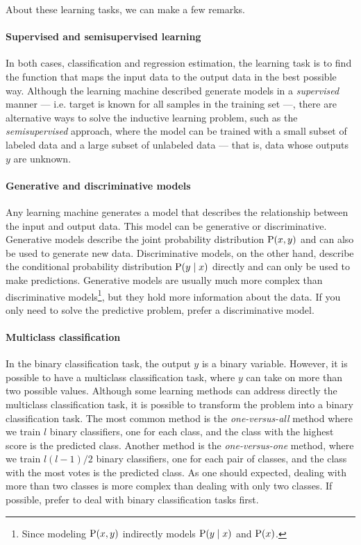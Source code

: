 About these learning tasks, we can make a few remarks.

\paragraph{Supervised and semisupervised learning}
In both cases, classification and regression estimation, the learning task is to find the function
that maps the input data to the output data in the best possible way.  Although the
learning machine described generate models in a \emph{supervised} manner --- i.e. target
is known for all samples in the training set ---, there are
alternative ways to solve the inductive learning problem, such as the \emph{semisupervised}
approach, where the model can be trained with a small subset of labeled data and a large
subset of unlabeled data --- that is, data whose outputs $y$ are unknown.

\paragraph{Generative and discriminative models}
Any learning machine generates a model that describes the relationship between the input
and output data.  This model can be generative or discriminative.  Generative models
describe the joint probability distribution $\operatorname{P}(x, y)$ and can also be used to generate new
data.  Discriminative models, on the other hand, describe the conditional probability
distribution $\operatorname{P}(y \mid x)$ directly and can only be used to make predictions. Generative models are
usually much more complex than discriminative models\footnote{Since modeling $\operatorname{P}(x, y)$
indirectly models $\operatorname{P}(y \mid x)$ and $\operatorname{P}(x)$.}, but they hold more information about
the data.  If you only
need to solve the predictive problem, prefer a discriminative model.

\paragraph{Multiclass classification}
In the binary classification task, the output $y$ is
a binary variable.  However, it is possible to have a multiclass classification task,
where  $y$ can take on more than two possible values.  Although some learning methods can
address directly the multiclass classification task, it is possible to transform the
problem into a binary classification task.  The most common method is the
\emph{one-versus-all} method where we train $l$ binary classifiers, one for each class,
and the class with the highest score is the predicted class.  Another method is the
\emph{one-versus-one} method, where we train $l(l-1)/2$ binary classifiers, one for each
pair of classes, and the class with the most votes is the predicted class.
As one should expected, dealing with more than two classes is more complex than dealing
with only two classes.  If possible, prefer to deal with binary classification tasks first.

